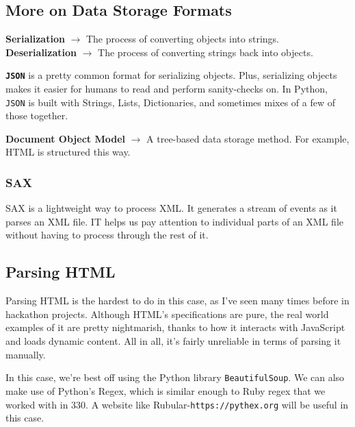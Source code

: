 \documentclass[english, 10pt]{article}
\begin{document}
\subsection{More on Data Storage Formats}

\begin{tcolorbox}[title=Definition:,colframe=red!75!black,colback=red!5!white,arc=0pt,fonttitle=\bfseries]
\textbf{Serialization} $\rightarrow$ The process of converting objects into strings.\newline
\textbf{Deserialization} $\rightarrow$ The process of converting strings back into objects.
\end{tcolorbox}

\textbf{\texttt{JSON}} is a pretty common format for serializing objects. Plus, serializing objects makes it easier for humans to read and perform sanity-checks on. In Python, \texttt{JSON} is built with Strings, Lists, Dictionaries, and sometimes mixes of a few of those together.\newline

\begin{tcolorbox}[title=Definition:,colframe=red!75!black,colback=red!5!white,arc=0pt,fonttitle=\bfseries]
\textbf{Document Object Model} $\rightarrow$ A tree-based data storage method. For example, HTML is structured this way.
\end{tcolorbox}

\subsubsection{SAX}

SAX is a lightweight way to process XML. It generates a stream of events as it parses an XML file. IT helps us pay attention to individual parts of an XML file without having to process through the rest of it.

\subsection{Parsing HTML}

Parsing HTML is the hardest to do in this case, as I've seen many times before in hackathon projects. Although HTML's specifications are pure, the real world examples of it are pretty nightmarish, thanks to how it interacts with JavaScript and loads dynamic content. All in all, it's fairly unreliable in terms of parsing it manually.\newline

In this case, we're best off using the Python library \texttt{BeautifulSoup}. We can also make use of Python's Regex, which is similar enough to Ruby regex that we worked with in 330. A website like Rubular-\texttt{https://pythex.org} will be useful in this case.\newline
\end{document}
